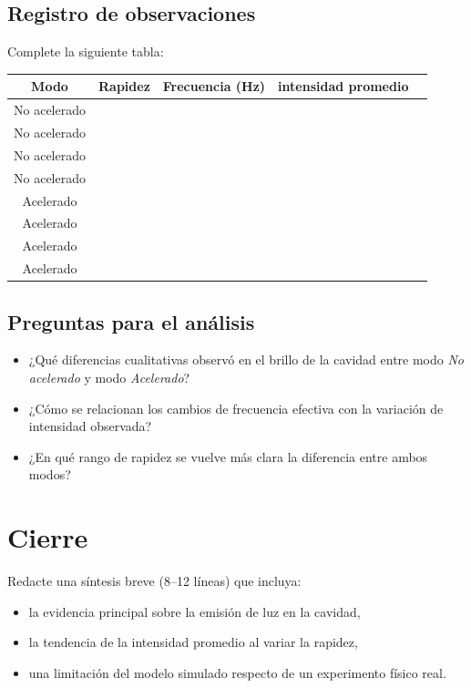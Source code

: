 \documentclass{aa}
\begin{document}
\subsection{Registro de observaciones}

Complete la siguiente tabla:

\begin{center}
\begin{tabular}{|c|c|c|c|c|}
\hline
Modo & Rapidez & Frecuencia (Hz) & intensidad promedio \\
\hline
No acelerado & & & \\
\hline
No acelerado & & & \\
\hline
No acelerado & & & \\
\hline
No acelerado & & & \\
\hline
Acelerado & & & \\
\hline
Acelerado & & & \\
\hline
Acelerado & & & \\
\hline
Acelerado & & & \\
\hline
\end{tabular}
\end{center}

\subsection{Preguntas para el análisis}

\begin{itemize}
  \item ¿Qué diferencias cualitativas observó en el brillo de la cavidad entre modo \emph{No acelerado} y modo \emph{Acelerado}?
  \item ¿Cómo se relacionan los cambios de frecuencia efectiva con la variación de intensidad observada?
  \item ¿En qué rango de rapidez se vuelve más clara la diferencia entre ambos modos?
\end{itemize}

\section{Cierre}

Redacte una síntesis breve (8--12 líneas) que incluya:

\begin{itemize}
  \item la evidencia principal sobre la emisión de luz en la cavidad,
  \item la tendencia de la intensidad promedio al variar la rapidez,
  \item una limitación del modelo simulado respecto de un experimento físico real.
\end{itemize}
\end{document}
